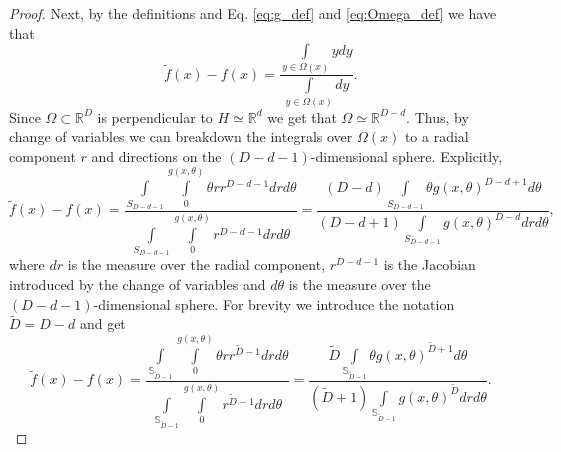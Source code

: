 \documentclass[12pt]{article}
\theoremstyle{remark}
\newcommand{\RR}{\mathbb{R}}
\newcommand{\wtilde}[1]{\widetilde{#1}}
\begin{document}
\begin{appendices}
\begin{proof}
Next, by the definitions and Eq. \eqref{eq:g_def} and \eqref{eq:Omega_def} we have that 
\begin{equation*}
\wtilde{f}(x) - f(x) = \frac{\int\limits_{y\in\Omega(x)} y dy}{\int\limits_{y\in\Omega(x)} dy} 
.\end{equation*}
Since $\Omega \subset \RR^D$ is perpendicular to $H\simeq \RR^d$ we get that $\Omega\simeq \RR^{D-d}$.
Thus, by change of variables we can breakdown the integrals over $\Omega(x)$ to a radial component $r$ and directions on the $(D-d-1)$-dimensional sphere.
Explicitly,
\begin{equation*}
\wtilde{f}(x) - f(x) = 
\frac{\int\limits_{S_{D-d-1}}\int\limits_0^{g(x,\theta)} \theta r r^{D-d-1} drd\theta}{\int\limits_{S_{D-d-1}}\int\limits_0^{g(x,\theta)} r^{D-d-1} drd\theta}  = 
\frac{(D-d)\int\limits_{S_{D-d-1}}\theta g(x,\theta)^{D-d+1} d\theta}{(D-d+1)\int\limits_{S_{D-d-1}}g(x,\theta)^{D-d} drd\theta}     
,\end{equation*}
where $dr$ is the measure over the radial component, $r^{D-d-1}$ is the Jacobian introduced by the change of variables and $d\theta$ is the measure over the $(D-d-1)$-dimensional sphere.
For brevity we introduce the notation $\wtilde D = D - d$ and get
\begin{equation}\label{eq:f_tilde-f_integrals}
\wtilde{f}(x) - f(x) = 
\frac{\int\limits_{\mathbb{S}_{\wtilde D-1}}\int\limits_0^{g(x,\theta)} \theta r r^{\wtilde D-1} drd\theta}{\int\limits_{\mathbb{S}_{\wtilde D-1}}\int\limits_0^{g(x,\theta)} r^{\wtilde D-1} drd\theta}  = 
\frac{\wtilde D \int\limits_{\mathbb{S}_{\wtilde D-1}}\theta g(x,\theta)^{\wtilde D+1} d\theta}{(\wtilde D+1)\int\limits_{\mathbb{S}_{\wtilde D-1}}g(x,\theta)^{\wtilde D} drd\theta}     
.\end{equation}
 

\end{proof}
\end{appendices}
\end{document}
